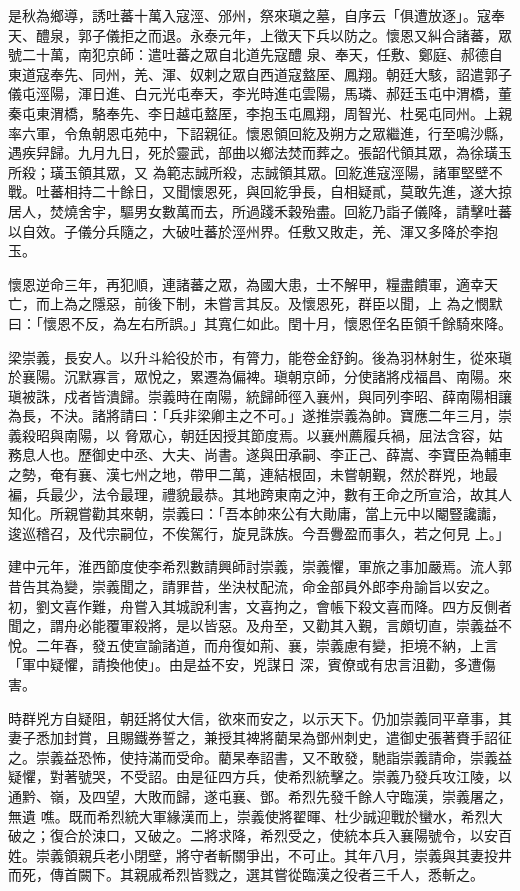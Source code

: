 \begin{pinyinscope}
 是秋為鄉導，誘吐蕃十萬入寇涇、邠州，祭來瑱之墓，自序云「俱遭放逐」。寇奉天、醴泉，郭子儀拒之而退。永泰元年，上徵天下兵以防之。懷恩又糾合諸蕃，眾號二十萬，南犯京師：遣吐蕃之眾自北道先寇醴
 泉、奉天，任敷、鄭庭、郝德自東道寇奉先、同州，羌、渾、奴剌之眾自西道寇盩厔、鳳翔。朝廷大駭，詔遣郭子儀屯涇陽，渾日進、白元光屯奉天，李光時進屯雲陽，馬璘、郝廷玉屯中渭橋，董秦屯東渭橋，駱奉先、李日越屯盩厔，李抱玉屯鳳翔，周智光、杜冕屯同州。上親率六軍，令魚朝恩屯苑中，下詔親征。懷恩領回紇及朔方之眾繼進，行至鳴沙縣，遇疾舁歸。九月九日，死於靈武，部曲以鄉法焚而葬之。張韶代領其眾，為徐璜玉所殺；璜玉領其眾，又
 為範志誠所殺，志誠領其眾。回紇進寇涇陽，諸軍堅壁不戰。吐蕃相持二十餘日，又聞懷恩死，與回紇爭長，自相疑貳，莫敢先進，遂大掠居人，焚燒舍宇，驅男女數萬而去，所過踐禾穀殆盡。回紇乃詣子儀降，請擊吐蕃以自效。子儀分兵隨之，大破吐蕃於涇州界。任敷又敗走，羌、渾又多降於李抱玉。



 懷恩逆命三年，再犯順，連諸蕃之眾，為國大患，士不解甲，糧盡饋軍，適幸天亡，而上為之隱惡，前後下制，未嘗言其反。及懷恩死，群臣以聞，上
 為之憫默曰：「懷恩不反，為左右所誤。」其寬仁如此。閏十月，懷恩侄名臣領千餘騎來降。



 梁崇義，長安人。以升斗給役於市，有膂力，能卷金舒鉤。後為羽林射生，從來瑱於襄陽。沉默寡言，眾悅之，累遷為偏裨。瑱朝京師，分使諸將戍福昌、南陽。來瑱被誅，戍者皆潰歸。崇義時在南陽，統歸師徑入襄州，與同列李昭、薛南陽相讓為長，不決。諸將請曰：「兵非梁卿主之不可。」遂推崇義為帥。寶應二年三月，崇義殺昭與南陽，以
 脅眾心，朝廷因授其節度焉。以襄州薦履兵禍，屈法含容，姑務息人也。歷御史中丞、大夫、尚書。遂與田承嗣、李正己、薛嵩、李寶臣為輔車之勢，奄有襄、漢七州之地，帶甲二萬，連結根固，未嘗朝覲，然於群兇，地最褊，兵最少，法令最理，禮貌最恭。其地跨東南之沖，數有王命之所宣洽，故其人知化。所親嘗勸其來朝，崇義曰：「吾本帥來公有大勛庸，當上元中以閹豎讒讟，逡巡稽召，及代宗嗣位，不俟駕行，旋見誅族。今吾釁盈而事久，若之何見
 上。」



 建中元年，淮西節度使李希烈數請興師討崇義，崇義懼，軍旅之事加嚴焉。流人郭昔告其為變，崇義聞之，請罪昔，坐決杖配流，命金部員外郎李舟諭旨以安之。初，劉文喜作難，舟嘗入其城說利害，文喜拘之，會帳下殺文喜而降。四方反側者聞之，謂舟必能覆軍殺將，是以皆惡。及舟至，又勸其入覲，言頗切直，崇義益不悅。二年春，發五使宣諭諸道，而舟復如荊、襄，崇義慮有變，拒境不納，上言「軍中疑懼，請換他使」。由是益不安，兇謀日
 深，賓僚或有忠言沮勸，多遭傷害。



 時群兇方自疑阻，朝廷將仗大信，欲來而安之，以示天下。仍加崇義同平章事，其妻子悉加封賞，且賜鐵券誓之，兼授其裨將藺杲為鄧州刺史，遣御史張著賚手詔征之。崇義益恐怖，使持滿而受命。藺杲奉詔書，又不敢發，馳詣崇義請命，崇義益疑懼，對著號哭，不受詔。由是征四方兵，使希烈統擊之。崇義乃發兵攻江陵，以通黔、嶺，及四望，大敗而歸，遂屯襄、鄧。希烈先發千餘人守臨漢，崇義屠之，無遺
 噍。既而希烈統大軍緣漢而上，崇義使將翟暉、杜少誠迎戰於蠻水，希烈大破之；復合於涑口，又破之。二將求降，希烈受之，使統本兵入襄陽號令，以安百姓。崇義領親兵老小閉壁，將守者斬關爭出，不可止。其年八月，崇義與其妻投井而死，傳首闕下。其親戚希烈皆戮之，選其嘗從臨漢之役者三千人，悉斬之。




\end{pinyinscope}
